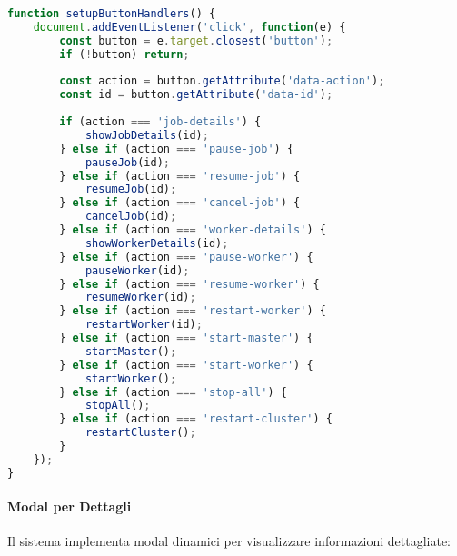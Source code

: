 \documentclass[12pt,a4paper]{article}
\begin{document}
\begin{lstlisting}[language=javascript, caption=Gestione Click Bottoni in dashboard.js]
function setupButtonHandlers() {
    document.addEventListener('click', function(e) {
        const button = e.target.closest('button');
        if (!button) return;
        
        const action = button.getAttribute('data-action');
        const id = button.getAttribute('data-id');
        
        if (action === 'job-details') {
            showJobDetails(id);
        } else if (action === 'pause-job') {
            pauseJob(id);
        } else if (action === 'resume-job') {
            resumeJob(id);
        } else if (action === 'cancel-job') {
            cancelJob(id);
        } else if (action === 'worker-details') {
            showWorkerDetails(id);
        } else if (action === 'pause-worker') {
            pauseWorker(id);
        } else if (action === 'resume-worker') {
            resumeWorker(id);
        } else if (action === 'restart-worker') {
            restartWorker(id);
        } else if (action === 'start-master') {
            startMaster();
        } else if (action === 'start-worker') {
            startWorker();
        } else if (action === 'stop-all') {
            stopAll();
        } else if (action === 'restart-cluster') {
            restartCluster();
        }
    });
}
\end{lstlisting}

\paragraph{Modal per Dettagli}
Il sistema implementa modal dinamici per visualizzare informazioni dettagliate:
\end{document}
